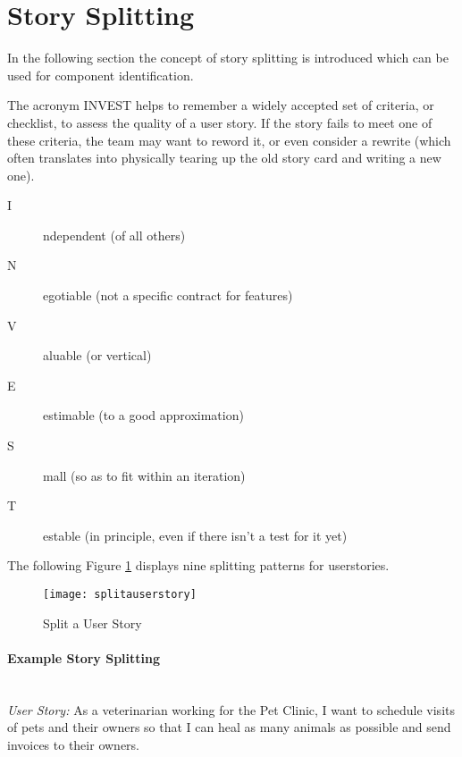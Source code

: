 \section{Story Splitting}
In the following section the concept of story splitting is introduced which can be used for component identification.

The acronym INVEST helps to remember a widely accepted set of criteria, or checklist, to assess the quality of a user story. If the story fails to meet one of these criteria, the team may want to reword it, or even consider a rewrite (which often translates into physically tearing up the old story card and writing a new one).

\begin{description}
	\item [I]ndependent (of all others)
	\item [N]egotiable (not a specific contract for features)
	\item [V]aluable (or vertical)
	\item [E]estimable (to a good approximation)
	\item [S]mall (so as to fit within an iteration)
	\item [T]estable (in principle, even if there isn't a test for it yet)
\end{description}

The following Figure \ref{fig:storysplitting} displays nine splitting patterns for userstories.

\begin{figure}[H]
  \center
  \texttt{[image: splitauserstory]}
  \caption{Split a User Story}
  \label{fig:storysplitting}
\end{figure}

\paragraph{Example Story Splitting} \hfill \\
\textit{User Story:} As a veterinarian working for the Pet Clinic, I want to schedule visits of pets and their owners so that I can heal as many animals as possible and send invoices to their owners.

